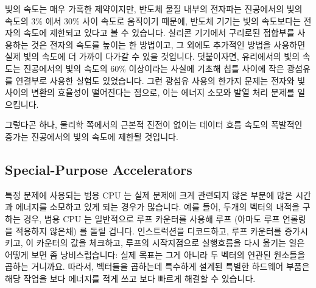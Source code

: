 빛의 속도는 매우 가혹한 제약이지만, 반도체 물질 내부의 전자파는 진공에서의 빛의
속도의 3\% 에서 30\% 사이 속도로 움직이기 때문에, 반도체 기기는 빛의 속도보다는
전자의 속도에 제한되고 있다고 볼 수 있습니다.
실리콘 기기에서 구리로된 접합부를 사용하는 것은 전자의 속도를 높이는 한
방법이고, 그 외에도 추가적인 방법을 사용하면 실제 빛의 속도에 더 가까이 다가갈
수 있을 것입니다.
덧붙이자면, 유리에서의 빛의 속도는 진공에서의 빛의 속도의 60\% 이상이라는
사실에 기초해 칩틀 사이에 작은 광섬유를 연결부로 사용한 실험도 있었습니다.
그런 광섬유 사용의 한가지 문제는 전자와 빛 사이의 변환의 효율성이 떨어진다는
점으로, 이는 에너지 소모와 발열 처리 문제를 일으킵니다.

그렇다곤 하나, 물리학 쪽에서의 근본적 진전이 없이는 데이터 흐름 속도의 폭발적인
증가는 진공에서의 빛의 속도에 제한될 것입니다.

\iffalse
Although the speed of light would be a hard limit, the fact is that
semiconductor devices are limited by the speed of electricity rather
than that of light, given that electric waves in semiconductor materials
move at between 3\% and 30\% of the speed of light in a vacuum.
The use of copper connections on silicon devices is one way to increase
the speed of electricity, and it is quite possible that additional
advances will push closer still to the actual speed of light.
In addition, there have been some experiments with tiny optical fibers
as interconnects within and between chips, based on the fact that
the speed of light in glass is more than 60\% of the speed of light
in a vacuum.
One obstacle to such optical fibers is the inefficiency conversion
between electricity and light and vice versa, resulting in both
power-consumption and heat-dissipation problems.

That said, absent some fundamental advances in the field of physics,
any exponential increases in the speed of data flow
will be sharply limited by the actual speed of light in a vacuum.
\fi

\subsection{Special-Purpose Accelerators}
\label{sec:cpu:Special-Purpose Accelerators}

특정 문제에 사용되는 범용 CPU 는 실제 문제에 크게 관련되지 않은 부분에 많은
시간과 에너지를 소모하고 있게 되는 경우가 많습니다.
예를 들어, 두개의 벡터의 내적을 구하는 경우, 범용 CPU 는 일반적으로 루프
카운터를 사용해 루프 (아마도 루프 언롤링을 적용하지 않은채) 를 돌릴 겁니다.
인스트럭션을 디코드하고, 루프 카운터를 증가시키고, 이 카운터의 값을 체크하고,
루프의 시작지점으로 실행흐름을 다시 옮기는 일은 어떻게 보면 좀 낭비스럽습니다:
실제 목표는 그게 아니라 두 벡터의 연관된 원소들을 곱하는 거니까요.
따라서, 벡터들을 곱하는데 특수하게 설계된 특별한 하드웨어 부품은 해당 작업을
보다 에너지를 적게 쓰고 보다 빠르게 해결할 수 있습니다.

